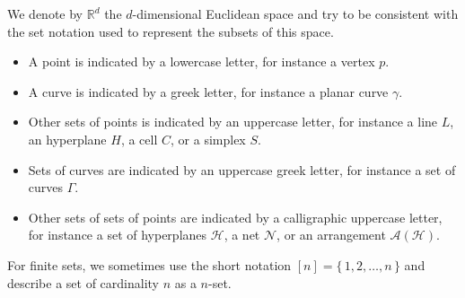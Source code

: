 We denote by \(\mathbb{R}^d\) the \(d\)-dimensional Euclidean space
and try to be consistent with the set notation used to represent the subsets
of this space.
\begin{itemize}
	\item A point is indicated by a lowercase letter, for instance a vertex \(p\).
	\item A curve is indicated by a greek letter, for instance
		a planar curve \(\gamma\).
	\item Other sets of points is indicated by an uppercase letter, for instance
		a line \(L\),
		an hyperplane \(H\),
		a cell \(C\),
		or a simplex \(S\).
	\item Sets of curves are indicated by an uppercase greek letter, for
		instance
		a set of curves \(\Gamma\).
	\item Other sets of sets of points are indicated by a calligraphic uppercase
		letter, for instance
		a set of hyperplanes \(\mathcal{H}\),
		a net \(\mathcal{N}\), or an arrangement \(\mathcal{A}(\mathcal{H})\).
\end{itemize}

For finite sets,
we sometimes use the short notation \([n] = \{\,1,2,\ldots ,n\,\}\) and
describe a set of cardinality \(n\) as a \(n\)-set.

